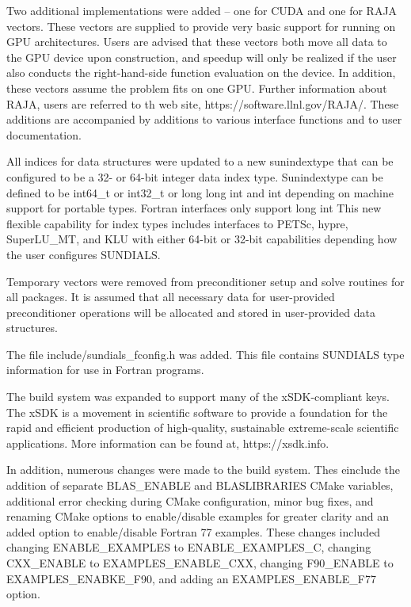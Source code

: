 Two additional {\nvector} implementations were added -- one for
CUDA and one for RAJA vectors.  
These vectors are supplied to provide very basic support for running
on GPU architectures.  Users are advised that these vectors both move all data
to the GPU device upon construction, and speedup will only be realized if the
user also conducts the right-hand-side function evaluation on the device.
In addition, these vectors assume the problem fits on one GPU.
Further information about RAJA, users are referred to th web site, 
https://software.llnl.gov/RAJA/.
These additions are accompanied by additions to various interface functions
and to user documentation.

All indices for data structures were updated to a new sunindextype that
can be configured to be a 32- or 64-bit integer data index type. 
Sunindextype can be defined to be int64\_t or int32\_t or long long int and 
int depending on machine support for portable types.  
Fortran interfaces only support long int
This new flexible capability for index types includes interfaces to 
PETSc, hypre, SuperLU\_MT, and KLU with 
either 64-bit or 32-bit capabilities depending how the user configures 
SUNDIALS.

Temporary vectors were removed from preconditioner setup and solve
   routines for all packages.  It is assumed that all necessary data
   for user-provided preconditioner operations will be allocated and
   stored in user-provided data structures.

The file include/sundials\_fconfig.h was added.  This file contains 
SUNDIALS type information for use in Fortran programs.

The build system was expanded to support many of the xSDK-compliant keys. 
The xSDK is a movement in scientific software to provide a foundation for the
rapid and efficient production of high-quality, 
sustainable extreme-scale scientific applications.  More information can
be found at, https://xsdk.info.

In addition, numerous changes were made to the build system.
Thes einclude the addition of separate BLAS\_ENABLE and BLASLIBRARIES 
CMake variables, additional error checking during CMake configuration,
minor bug fixes, and renaming CMake options to enable/disable examples 
for greater clarity and an added option to enable/disable Fortran 77 examples.
These changes included changing ENABLE\_EXAMPLES to ENABLE\_EXAMPLES\_C, 
changing CXX\_ENABLE to EXAMPLES\_ENABLE\_CXX, changing F90\_ENABLE to 
EXAMPLES\_ENABKE\_F90, and adding an EXAMPLES\_ENABLE\_F77 option.

